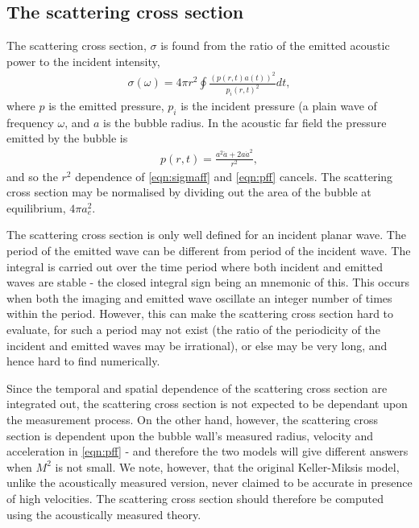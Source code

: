 \documentclass[10pt, fleqn,draft,showtrims,oldfontcommands]{article} %
\newcommand{\eqnref}[1]{\ref{eqn:#1}}
\newcommand{\lr}[1]{\left( #1 \right)}
\begin{document}
\subsection{ The scattering cross section}\label{sec:measurement:scatteringxs}
The scattering cross section, $\sigma$ is found from the ratio of the  emitted acoustic power to the incident intensity, \cite{ShutilovBook}
\begin{align}
  \sigma(\omega) = 4\pi r^2 \oint \frac{ \lr{p(r, t) a(t)}^2}{p_i(r,t)^2} dt,\label{eqn:sigmaff}
\end{align}
where $p$ is the emitted pressure, $p_i$ is the incident pressure (a plain wave of frequency $\omega$, and $a$ is the bubble radius.
In the acoustic far field the pressure emitted by the bubble\cite{Howe2003} is 
\begin{align}
p(r, t) =  \frac{a^2 \ddot a+  2a {\dot a}^2}{r^2}, \label{eqn:pff}
\end{align}
and so the $r^2$ dependence of \eqnref{sigmaff} and \eqnref{pff} cancels.
The scattering cross section may be normalised by dividing out the area of the bubble at equilibrium, $4\pi a_e^2$.


The scattering cross section is only well defined for an incident planar wave.
The period of the emitted wave can be different from period of the incident wave.
The integral is carried out over the
time period where both incident and emitted waves are stable - the closed integral sign being an mnemonic of this.
This occurs when both the imaging and emitted wave oscillate an integer number of times within the period.
However, this can make the scattering cross section hard to evaluate, 
for such a period may not exist (the ratio of the periodicity of the incident and emitted waves may be irrational),
or else may be very long, and hence hard to find numerically.


Since the temporal and spatial dependence of the scattering cross section are integrated out,
the scattering cross section is not expected to be dependant upon the measurement process.
On the other hand, however,
the scattering cross section is dependent upon the bubble wall's measured radius, velocity and acceleration
in \eqnref{pff} -
and therefore the two models will give different answers when $M^2$ is not small.
We note, however, that the original Keller-Miksis model, unlike the acoustically measured version,
never claimed to be accurate in presence of high velocities.
The scattering cross section should therefore be computed using the acoustically measured theory.
\end{document}
